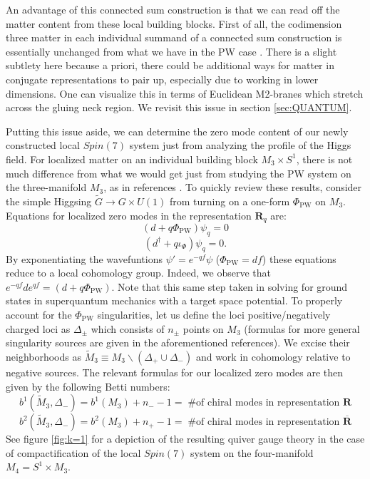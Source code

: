 \documentclass[12pt]{article}%
\numberwithin{equation}{section}
\renewcommand{\(}{\left(}
\renewcommand{\)}{\right)}
\renewcommand{\[}{\left[}
\renewcommand{\]}{\right]}
\begin{document}
An advantage of this connected sum construction is that we can read off the matter content from these local building blocks. First of all, the codimension three matter in each individual summand of a connected sum construction is essentially unchanged from what we have in the
PW case \cite{Pantev:2009de, Braun:2018vhk}. There is a slight subtlety here because a priori, there could be additional ways for matter in conjugate representations to pair up, especially due to working in lower dimensions. One can visualize this in terms of Euclidean M2-branes which stretch across the gluing neck region. We revisit this issue in section \ref{sec:QUANTUM}.

Putting this issue aside, we can determine the zero mode content of our newly constructed local $Spin(7)$ system just from analyzing the profile of the Higgs field. For localized matter on an individual building block $M_3 \times S^1$, there is not much difference from what we would get just from studying the PW system on the three-manifold $M_3$, as in references \cite{Pantev:2009de, Braun:2018vhk}. To quickly review these results, consider the simple Higgsing $\widetilde{G}\rightarrow G\times U(1)$ from turning on a one-form $\Phi_{\mathrm{PW}}$ on $M_3$. Equations for localized zero modes in the representation $\mathbf{R}_q$ are:
\begin{equation}
(d+q\Phi_{\mathrm{PW}})\psi_q=0
\end{equation}
\begin{equation}
(d^\dagger+q\iota_\Phi)\psi_q=0.
\end{equation}
By exponentiating the wavefuntions $\psi'=e^{-qf}\psi$ ($\Phi_{\mathrm{PW}}=df$)  these equations reduce to a local cohomology group. Indeed, we observe that $e^{-qf}de^{qf}=(d+q\Phi_{\mathrm{PW}})$. Note that this same step taken in solving for ground states in superquantum mechanics with a target space potential. To properly account for the $\Phi_{\mathrm{PW}}$ singularities, let us define the loci positive/negatively charged loci as $\Delta_\pm$ which consists of $n_{\pm}$ points on $M_3$ (formulas for more general singularity sources are given in the aforementioned references). We excise their neighborhoods as $\widetilde{M}_3 \equiv M_3 \backslash (\Delta_+\cup \Delta_-)$ and work in cohomology relative to negative sources. The relevant formulas for our localized zero modes are then given by the following Betti numbers:
\begin{equation}\label{PWmatter1}
b^1(\widetilde{M}_3,\Delta_-)=b^1(M_3)+n_--1= \; \text{\# of chiral modes in representation $\mathbf{R}$}
\end{equation}
\begin{equation}\label{PWmatter2}
b^2(\widetilde{M}_3,\Delta_-)=b^2(M_3)+n_+-1= \; \text{\# of chiral modes in representation $\overline{\mathbf{R}}$}
\end{equation}
See figure \ref{fig:k=1} for a depiction of the resulting quiver gauge theory in the case of compactification of the local $Spin(7)$ system on the four-manifold $M_4 = S^1 \times M_3$.
\end{document}
